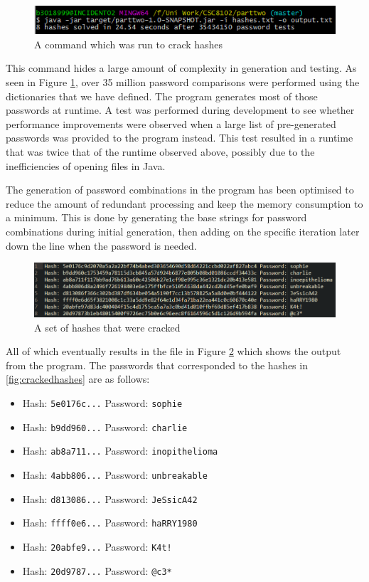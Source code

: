 \documentclass[10pt,journal,compsoc]{IEEEtran}
\begin{document}
\begin{figure}[h!]
	\centering
	\includegraphics[width=0.9\linewidth]{images/cracked_commands}
	\caption{A command which was run to crack hashes}
	\label{fig:crackedcommands}
\end{figure}

This command hides a large amount of complexity in generation and testing. As
seen in Figure \ref{fig:crackedcommands}, over 35 million password comparisons
were performed using the dictionaries that we have defined. The program
generates most of those passwords at runtime. A test was performed during
development to see whether performance improvements were observed when a large
list of pre-generated passwords was provided to the program instead. This test
resulted in a runtime that was twice that of the runtime observed above,
possibly due to the inefficiencies of opening files in Java.

The generation of password combinations in the program has been optimised to
reduce the amount of redundant processing and keep the memory consumption to a
minimum. This is done by generating the base strings for password combinations
during initial generation, then adding on the specific iteration later down the
line when the password is needed.

\begin{figure}[h!]
	\centering
	\includegraphics[width=0.9\linewidth]{images/cracked_passwords}
	\caption{A set of hashes that were cracked}
	\label{fig:crackedpasswords}
\end{figure}

All of which eventually results in the file in Figure
\ref{fig:crackedpasswords} which shows the output from the program. The
passwords that corresponded to the hashes in \ref{fig:crackedhashes} are as
follows:

\begin{itemize}
	\item Hash: \texttt{5e0176c...} Password: \texttt{sophie}
	\item Hash: \texttt{b9dd960...} Password: \texttt{charlie}
	\item Hash: \texttt{ab8a711...} Password: \texttt{inopithelioma}
	\item Hash: \texttt{4abb806...} Password: \texttt{unbreakable}
	\item Hash: \texttt{d813086...} Password: \texttt{JeSsicA42}
	\item Hash: \texttt{ffff0e6...} Password: \texttt{haRRY1980}
	\item Hash: \texttt{20abfe9...} Password: \texttt{K4t!}
	\item Hash: \texttt{20d9787...} Password: \texttt{@c3*}
\end{itemize}
\end{document}
